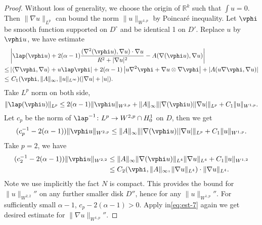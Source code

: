 \documentclass[UTF8,12pt]{article}
\theoremstyle{plain}\newtheorem{theorem}{Theorem}
\theoremstyle{definition}\newtheorem{definition}[theorem]{Definition}
\theoremstyle{definition}\newtheorem{example}[theorem]{Example}
\theoremstyle{plain}\newtheorem{axiom}[theorem]{Axiom}
\theoremstyle{plain}\newtheorem{assertion}[theorem]{Assertion}
\theoremstyle{plain}\newtheorem{corollary}[theorem]{Corollary}
\theoremstyle{plain}\newtheorem{lemma}[theorem]{Lemma}
\theoremstyle{plain}\newtheorem{proposition}[theorem]{Proposition}
\theoremstyle{plain}\newtheorem{prop}[theorem]{Proposition}
\theoremstyle{plain}\newtheorem{conjecture}[theorem]{Conjecture}
\theoremstyle{plain}\newtheorem{conj}[theorem]{Conjecture}
\theoremstyle{plain}\newtheorem{problem}[theorem]{Problem}
\theoremstyle{remark}\newtheorem{notation}[theorem]{Notation}
\theoremstyle{definition}\newtheorem*{question}{Question}
\theoremstyle{definition}\newtheorem*{answer}{Answer}
\theoremstyle{definition}\newtheorem*{goal}{Goal}
\theoremstyle{plain}\newtheorem*{application}{Application}
\theoremstyle{plain}\newtheorem*{exercise}{Exercise}
\theoremstyle{remark}\newtheorem*{remark}{Remark}
\theoremstyle{remark}\newtheorem*{note}{\small{Note}}
\numberwithin{equation}{section}
\numberwithin{theorem}{section}
\numberwithin{figure}{section}
\begin{document}
\begin{proof}
    Without loss of generality, we choose the origin of \(\mathbb{R}^k\) such that
    \(\int u=0\). Then \(\|\nabla u\|_{L^p}\) can bound the norm \(\|u\|_{W^{1,p}}\)
    by Poincaré inequality. Let \(\vphi\) be smooth function supported on \(D^\circ\)
    and be identical 1 on \(D'\). Replace \(u\) by \(\vphi u\), we have estimate
    \begin{align*}
        &\left|\lap (\vphi u)+2(\alpha-1) \frac{(\nabla^2(\vphi u),\nabla u)\cdot
        \nabla u}{R^2+|\nabla u|^2}-A(\nabla(\vphi u),\nabla u)\right| \\
        \le & \left|\left<\nabla\vphi,\nabla u\right>+u\lap\vphi\right|
        +2(\alpha-1)\left|u\nabla^2\vphi+\nabla u\otimes \nabla\vphi\right|
        +\left|A(u\nabla\vphi,\nabla u)\right|\\
        \le &\ C_1(\vphi,\|A\|_{\infty},\|u\|_{L^\infty})(|\nabla u|+|u|)
    .\end{align*}
    Take \(L^p\) norm on both side, \[
        \|\lap(\vphi u)\|_{L^p}
        \le 2(\alpha-1)\|\vphi u\|_{W^{2,p}}
        +\|A\|_{\infty}\||\nabla(\vphi u)||\nabla u|\|_{L^p}
        +C_1 \|u\|_{W^{1,p}}
    .\] 
    Let \(c_p\) be the norm of \(\lap^{-1}\colon L^p\to W^{2,p}\cap H_0^1\) on
    \(D\), then we get
    \begin{equation}\label{eq:est-7}
        (c_p^{-1}-2(\alpha-1))\|\vphi u\|_{W^{2,p}}
        \le \|A\|_{\infty}\||\nabla(\vphi u)||\nabla u|\|_{L^p}
        +C_1 \|u\|_{W^{1,p}}
    .\end{equation}
    Take \(p=2\), we have
    \begin{align*}
        (c_2^{-1}-2(\alpha-1))\|\vphi u\|_{W^{2,2}}
        &\le \|A\|_{\infty}\|\nabla(\vphi u)\|_{L^4}\|\nabla u\|_{L^4}
        +C_1\|u\|_{W^{1,2}} \\
        &\le C_2(\vphi,\|A\|_{\infty},\|\nabla u\|_{L^4})\cdot\|\nabla u\|_{L^4}
    .\end{align*}
    Note we use implicitly the fact \(N\) is compact. This provides the bound for
    \(\|u\|_{W^{2,2}}''\) on any further smaller disk \(D''\), hence for any 
    \(\|u\|_{W^{1,p}}''\). For sufficiently small \(\alpha-1\), \(c_p-2(\alpha-1)>0\).
    Apply in\cref{eq:est-7} again we get desired estimate for
    \(\|\nabla u\|_{W^{1,p}}''\).
\end{proof}
\end{document}
